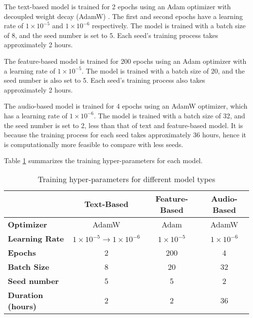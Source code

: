 The text-based model is trained for 2 epochs using an Adam optimizer with decoupled weight decay (AdamW) . The first and second epochs have a learning rate of $1 \times 10^{-5}$ and $1 \times 10^{-6}$ respectively. The model is trained with a batch size of 8, and the seed number is set to 5. Each seed's training process takes approximately 2 hours.

The feature-based model is trained for 200 epochs using an Adam optimizer with a learning rate of $1 \times 10^{-5}$. The model is trained with a batch size of 20, and the seed number is also set to 5. Each seed's training process also takes approximately 2 hours.

The audio-based model is trained for 4 epochs using an AdamW optimizer, which has a learning rate of $1 \times 10^{-6}$. The model is trained with a batch size of 32, and the seed number is set to 2, less than that of text and feature-based model. It is because the training process for each seed takes approximately 36 hours, hence it is computationally more feasible to compare with less seeds.


Table \ref{tab:training_hyper_param} summarizes the training hyper-parameters for each model.

\begin{table}[H]
    \centering
    \begin{tabular}{|l|c|c|c|}
        \hline
                                  & \textbf{Text-Based}                             & \textbf{Feature-Based} & \textbf{Audio-Based} \\
        \hline
        \textbf{Optimizer}        & AdamW                                           & Adam                   & AdamW                \\ \hline
        \textbf{Learning Rate}    & $1 \times 10^{-5} \rightarrow 1 \times 10^{-6}$ & $1 \times 10^{-5}$     & $1 \times 10^{-6}$   \\ \hline
        \textbf{Epochs}           & 2                                               & 200                    & 4                    \\ \hline
        \textbf{Batch Size}       & 8                                               & 20                     & 32                   \\ \hline
        \textbf{Seed number}      & 5                                               & 5                      & 2                    \\ \hline
        \textbf{Duration (hours)} & 2                                               & 2                      & 36                   \\ \hline
    \end{tabular}
    \caption{Training hyper-parameters for different model types}
    \label{tab:training_hyper_param}
\end{table}

